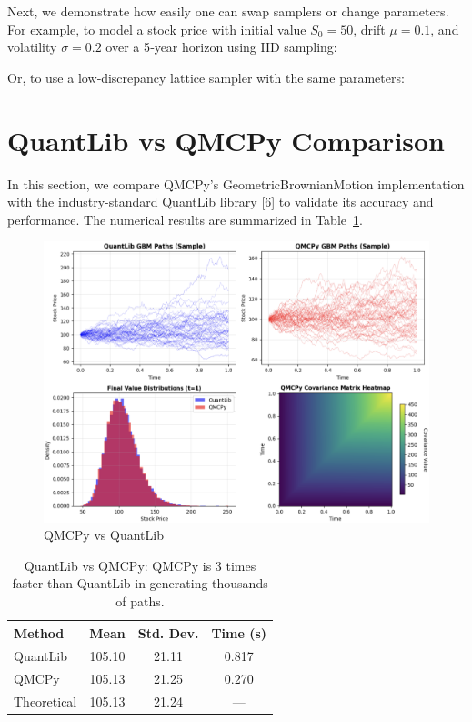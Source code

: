 \documentclass{article}
\begin{document}
Next, we demonstrate how easily one can swap samplers or change parameters.  For example, to model a stock price
with initial value $S_0=50$, drift $\mu=0.1$, and volatility $\sigma=0.2$ over a 5‐year horizon using IID sampling:


Or, to use a low‐discrepancy lattice sampler with the same parameters:




\section{QuantLib vs QMCPy Comparison}

In this section, we compare QMCPy's GeometricBrownianMotion implementation with the industry-standard QuantLib library [6] to validate its accuracy and performance. The numerical results are summarized in Table~\ref{tab2}.



\begin{figure}[t!]
\centering
\includegraphics[width=1\textwidth]{images/figure_5.png}
\caption{QMCPy vs QuantLib}
\end{figure}

\begin{table}[t]
\centering
\caption{QuantLib vs QMCPy: QMCPy is 3 times faster than QuantLib in generating thousands of paths.}
\begin{tabular}{lccc}
\toprule
\textbf{Method} & \textbf{Mean} & \textbf{Std. Dev.} & \textbf{Time (s)}   \\
\midrule
QuantLib & 105.10 & 21.11 & 0.817  \\
QMCPy & 105.13 & 21.25 & 0.270  \\
Theoretical & 105.13 & 21.24 & ---  \\
\bottomrule
\end{tabular}
\label{tab2}
\end{table}
\end{document}
